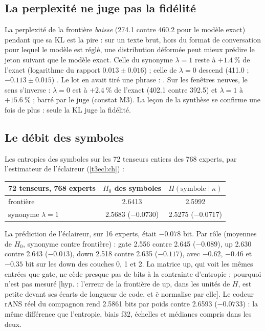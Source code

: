 \subsection{La perplexité ne juge pas la fidélité}\label{t3sno:sec:perplexite}

La perplexité de la frontière \emph{baisse} (\num{274.1} contre \num{460.2} pour le modèle exact) pendant que sa KL est la pire : sur un texte brut, hors du format de conversation pour lequel le modèle est réglé, une distribution déformée peut mieux prédire le jeton suivant que le modèle exact. Celle du synonyme $\lambda = 1$ reste à $+\SI{1.4}{\percent}$ de l'exact (logarithme du rapport $\num{0.013} \pm \num{0.016}$) ; celle de $\lambda = 0$ descend (\num{411.0} ; $-\num{0.113} \pm \num{0.015}$) \mes. Le lot en avait tiré une phrase : . Sur les fenêtres neuves, le sens s'inverse : $\lambda = 0$ est à $+\SI{2.4}{\percent}$ de l'exact (\num{402.1} contre \num{392.5}) et $\lambda = 1$ à $+\SI{15.6}{\percent}$ \mes ; barré par le juge (constat M3). La leçon de la synthèse se confirme une fois de plus : seule la KL juge la fidélité.

\subsection{Le débit des symboles}\label{t3sno:sec:debit}

Les entropies des symboles sur les 72 tenseurs entiers des 768 experts, par l'estimateur de l'éclaireur (\cref{t3ecl:ch}) \mes :

\begin{center}\footnotesize
\begin{tabular}{@{}lcc@{}}
\toprule
72 tenseurs, 768 experts & $H_0$ des symboles & $H(\text{symbole} \mid \kappa)$ \\
\midrule
frontière & \num{2.6413} & \num{2.5992} \\
synonyme $\lambda = 1$ & \num{2.5683} ($-\num{0.0730}$) & \num{2.5275} ($-\num{0.0717}$) \\
\bottomrule
\end{tabular}
\end{center}

La prédiction de l'éclaireur, sur 16 experts, était $-\num{0.078}$ bit. Par rôle (moyennes de $H_0$, synonyme contre frontière) : gate \num{2.556} contre \num{2.645} ($-\num{0.089}$), up \num{2.630} contre \num{2.643} ($-\num{0.013}$), down \num{2.518} contre \num{2.635} ($-\num{0.117}$), avec $-\num{0.62}$, $-\num{0.46}$ et $-\num{0.35}$ bit sur les down des couches 0, 1 et 2. La matrice up, qui voit les mêmes entrées que gate, ne cède presque pas de bits à la contrainte d'entropie ; pourquoi n'est pas mesuré [hyp. : l'erreur de la frontière de up, dans les unités de $H$, est petite devant ses écarts de longueur de code, et $\bar c$ normalise par elle]. Le codeur rANS réel du compagnon \parencite{duda2013ans} rend \num{2.5861} bits par poids contre \num{2.6593} ($-\num{0.0733}$) : la même différence que l'entropie, biais f32, échelles et médianes compris dans les deux.

